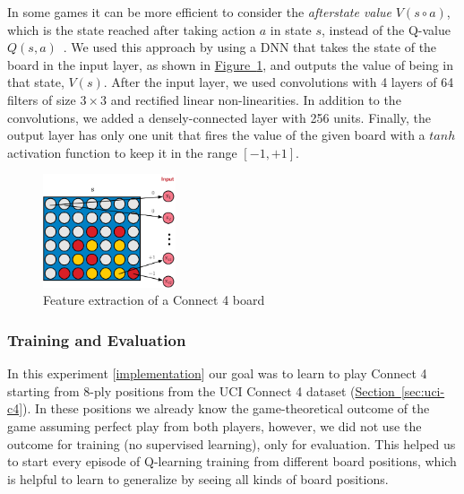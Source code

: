 \documentclass{article}
\newcommand{\GithubURL}[1]{[\href{https://github.com/davidrobles/mlnd-capstone-code/blob/master/#1}{implementation}]}
\begin{document}
In some games it can be more efficient to consider the \emph{afterstate value} $V(s \circ a)$, which
is the state reached after taking action $a$ in state $s$, instead of the Q-value $Q(s,
a)$~\citep{Sutton1998RL}. We used this approach by using a DNN that takes the state of the board in
the input layer, as shown in \hyperref[fig:c4-dnn-input] {Figure~\ref*{fig:c4-dnn-input}}, and
outputs the value of being in that state, $V(s)$. After the input layer, we used convolutions with 4
layers of 64 filters of size $3\times3$ and rectified linear non-linearities. In addition to the
convolutions, we added a densely-connected layer with 256 units. Finally, the output layer has only
one unit that fires the value of the given board with a $tanh$ activation function to keep it in the
range $[-1, +1]$.



\begin{figure}[!h]
    \centering
    \includegraphics[width=0.35\textwidth]{figures/c4-dnn-input.pdf}
    \caption{Feature extraction of a Connect 4 board}
    \label{fig:c4-dnn-input}
\end{figure}

\subsubsection{Training and Evaluation}

In this experiment \GithubURL{experiments/c4_dvn_uci.py} our goal was to learn to play Connect 4
starting from 8-ply positions from the UCI Connect 4 dataset (\hyperref[sec:uci-c4]
{Section~\ref*{sec:uci-c4}}). In these positions we already know the game-theoretical outcome of the
game assuming perfect play from both players, however, we did not use the outcome for training (no
supervised learning), only for evaluation. This helped us to start every episode of Q-learning
training from different board positions, which is helpful to learn to generalize by seeing all kinds
of board positions.
\end{document}
